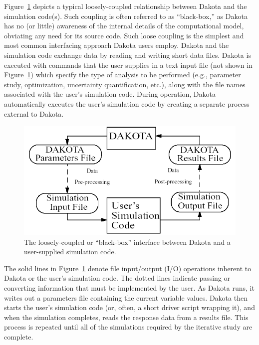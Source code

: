 Figure~\ref{intro:bbinterface} depicts a typical loosely-coupled
relationship between Dakota and the simulation code(s). Such coupling
is often referred to as ``black-box,'' as Dakota has no (or little)
awareness of the internal details of the computational model,
obviating any need for its source code. Such loose coupling is the
simplest and most common interfacing approach Dakota users
employ. Dakota and the simulation code exchange data by reading and
writing short data files. Dakota is executed with commands that the
user supplies in a text input file (not shown in
Figure~\ref{intro:bbinterface}) which specify the type of analysis to
be performed (e.g., parameter study, optimization, uncertainty
quantification, etc.), along with the file names associated with the
user's simulation code. During operation, Dakota automatically
executes the user's simulation code by creating a separate process
external to Dakota.

\begin{figure}
  \centering
  \includegraphics[scale=0.60]{images/dakota_flowchart}
  \caption{The loosely-coupled or ``black-box'' interface between
    Dakota and a user-supplied simulation code.}
  \label{intro:bbinterface}
\end{figure}

The solid lines in Figure~\ref{intro:bbinterface} denote file
input/output (I/O) operations inherent to Dakota or the user's
simulation code. The dotted lines indicate passing or converting
information that must be implemented by the user. As Dakota runs, it
writes out a parameters file containing the current variable values.
Dakota then starts the user's simulation code (or, often, a short
driver script wrapping it), and when the simulation completes, reads
the response data from a results file. This process is repeated until
all of the simulations required by the iterative study are complete.

